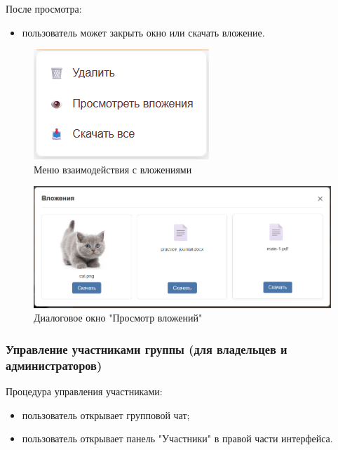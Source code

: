 После просмотра:
\begin{itemize}
	\item пользователь может закрыть окно или скачать вложение.
\end{itemize}

\begin{figure}[h]
	\centering
	\includegraphics[width=0.8\linewidth]{"images/Меню взаимодействия с вложениями"}
	\caption{Меню взаимодействия с вложениями}
	\label{fig:attachment-menu}
\end{figure}

\begin{figure}[h]
	\centering
	\includegraphics[width=0.8\linewidth]{"images/Окно просмотра вложений"}
	\caption{Диалоговое окно "Просмотр вложений"}
	\label{fig:attachment-view}
\end{figure}

\subsubsection{Управление участниками группы (для владельцев и администраторов)}
Процедура управления участниками:
\begin{itemize}
	\item пользователь открывает групповой чат;
	\item пользователь открывает панель "Участники" в правой части интерфейса.
\end{itemize}

